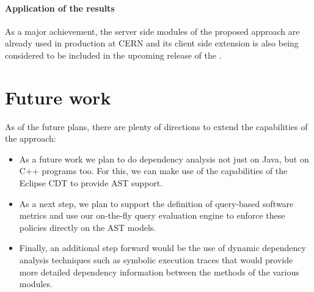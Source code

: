 
% 

\paragraph*{Application of the results}
As a major achievement, the server side modules of the proposed approach are
already used in production at CERN and its client side extension is also being
considered to be included in the upcoming release of the \ptool.

\section{Future work}
As of the future plans, there are plenty of directions to extend the
capabilities of the approach:
\begin{itemize}


\item As a future work we plan to do dependency analysis not just on 
Java, but on C++ programs too. For this, we can make use of the capabilities
of the Eclipse CDT to provide AST support.

\item As a next step, we plan to support the definition of query-based
software metrics and use our on-the-fly query evaluation engine to enforce these
policies directly on the AST models.

\item Finally, an additional step forward would be the use of dynamic dependency
analysis techniques such as symbolic execution traces that would provide more
detailed dependency information between the methods of the various modules.
\end{itemize}

